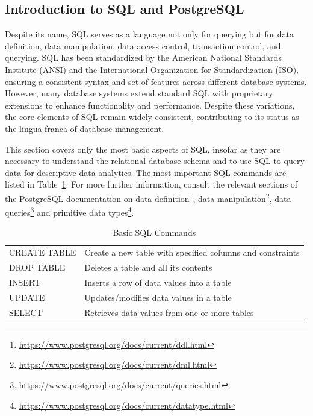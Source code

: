 \begin{withcode}
\section{Introduction to SQL and PostgreSQL}

Despite its name, SQL serves as a language not only for querying but for data definition, data manipulation, data access control, transaction control, and querying. SQL has been standardized by the American National Standards Institute (ANSI) and the International Organization for Standardization (ISO), ensuring a consistent syntax and set of features across different database systems. However, many database systems extend standard SQL with proprietary extensions to enhance functionality and performance. Despite these variations, the core elements of SQL remain widely consistent, contributing to its status as the lingua franca of database management. 

This section covers only the most basic aspects of SQL, insofar as they are necessary to understand the relational database schema and to use SQL to query data for descriptive data analytics. The most important SQL commands are listed in Table~\ref{tab:sql}. For more further information, consult the relevant sections of the PostgreSQL documentation on data definition\footnote{\url{https://www.postgresql.org/docs/current/ddl.html}}, data manipulation\footnote{\url{https://www.postgresql.org/docs/current/dml.html}}, data queries\footnote{\url{https://www.postgresql.org/docs/current/queries.html}} and primitive data types\footnote{\url{https://www.postgresql.org/docs/current/datatype.html}}.

\begin{table}
\renewcommand{\arraystretch}{1.25}
\centering

\begin{tabular}{l|l} \hline
CREATE TABLE & Create a new table with specified columns and constraints \\ 
DROP TABLE & Deletes a table and all its contents \\
INSERT & Inserts a row of data values into a table \\
UPDATE & Updates/modifies data values in a table \\
SELECT & Retrieves data values from one or more tables \\ \hline
\end{tabular}
\caption{Basic SQL Commands}
\label{tab:sql}
\end{table}


\end{withcode}
